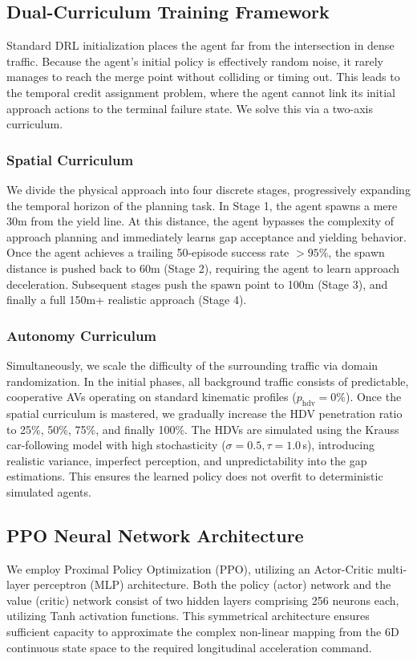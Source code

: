 \documentclass[conference]{IEEEtran}
\begin{document}
\subsection{Dual-Curriculum Training Framework}
Standard DRL initialization places the agent far from the intersection in dense traffic. Because the agent's initial policy is effectively random noise, it rarely manages to reach the merge point without colliding or timing out. This leads to the temporal credit assignment problem, where the agent cannot link its initial approach actions to the terminal failure state. We solve this via a two-axis curriculum.

\subsubsection{Spatial Curriculum}
We divide the physical approach into four discrete stages, progressively expanding the temporal horizon of the planning task. In Stage 1, the agent spawns a mere 30m from the yield line. At this distance, the agent bypasses the complexity of approach planning and immediately learns gap acceptance and yielding behavior. Once the agent achieves a trailing 50-episode success rate $>95\%$, the spawn distance is pushed back to 60m (Stage 2), requiring the agent to learn approach deceleration. Subsequent stages push the spawn point to 100m (Stage 3), and finally a full 150m+ realistic approach (Stage 4). 

\subsubsection{Autonomy Curriculum}
Simultaneously, we scale the difficulty of the surrounding traffic via domain randomization. In the initial phases, all background traffic consists of predictable, cooperative AVs operating on standard kinematic profiles ($p_{\text{hdv}} = 0\%$). Once the spatial curriculum is mastered, we gradually increase the HDV penetration ratio to 25\%, 50\%, 75\%, and finally 100\%. The HDVs are simulated using the Krauss car-following model with high stochasticity ($\sigma=0.5, \tau=1.0$\,s), introducing realistic variance, imperfect perception, and unpredictability into the gap estimations. This ensures the learned policy does not overfit to deterministic simulated agents.

\subsection{PPO Neural Network Architecture}
We employ Proximal Policy Optimization (PPO), utilizing an Actor-Critic multi-layer perceptron (MLP) architecture. Both the policy (actor) network and the value (critic) network consist of two hidden layers comprising 256 neurons each, utilizing Tanh activation functions. This symmetrical architecture ensures sufficient capacity to approximate the complex non-linear mapping from the 6D continuous state space to the required longitudinal acceleration command.
\end{document}

